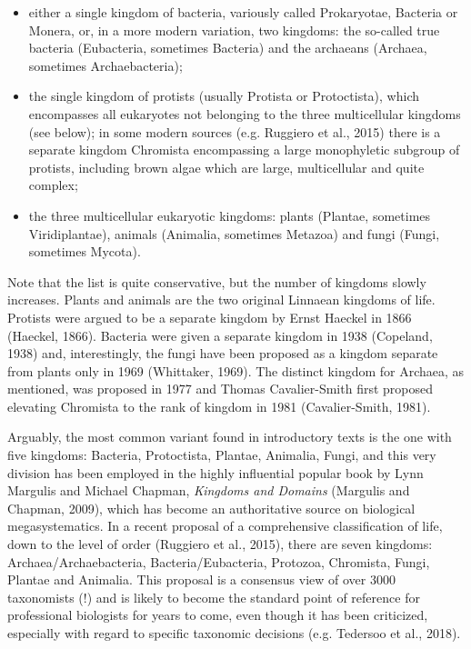 \documentclass[a4paper]{article}
\begin{document}
\begin{itemize}
\item either a single kingdom of bacteria, variously called Prokaryotae, Bacteria or Monera, or, in a more modern
variation, two kingdoms: the so-called true bacteria (Eubacteria, sometimes Bacteria) and the archaeans (Archaea,
sometimes Archaebacteria);
\item the single kingdom of protists (usually Protista or Protoctista), which encompasses all eukaryotes not belonging
to the three multicellular kingdoms (see below); in some modern sources \label{ref:RNDdqkS30YvK5}(e.g. Ruggiero et al.,
2015) there is a separate kingdom Chromista encompassing a large monophyletic subgroup of protists, including brown
algae which are large, multicellular and quite complex;
\item the three multicellular eukaryotic kingdoms: plants (Plantae, sometimes Viridiplantae), animals (Animalia,
sometimes Metazoa) and fungi (Fungi, sometimes Mycota). 
\end{itemize}
Note that the list is quite conservative, but the number of kingdoms slowly increases. Plants and  animals are the two
original Linnaean kingdoms of life. Protists were argued to be a separate kingdom by Ernst Haeckel in 1866
\label{ref:RNDnC4UhA8FAD}(Haeckel, 1866). Bacteria were given a separate kingdom in 1938
\label{ref:RNDsDaQPHVHjj}(Copeland, 1938) and, interestingly, the fungi have been proposed as a kingdom separate from
plants only in 1969 \label{ref:RNDzC4ki5UDBu}(Whittaker, 1969). The distinct kingdom for Archaea, as mentioned, was
proposed in 1977 and Thomas Cavalier-Smith first proposed elevating Chromista to the rank of kingdom in 1981
\label{ref:RNDnKGExfa2wY}(Cavalier-Smith, 1981). 

Arguably, the most common variant found in introductory texts is the one with five kingdoms: Bacteria, Protoctista,
Plantae, Animalia, Fungi, and this very division has been employed in the highly influential popular book by Lynn
Margulis and Michael Chapman, \textit{Kingdoms and Domains }\label{ref:RND5xqZMYPEO1}(Margulis and Chapman, 2009),
which has become an authoritative source on biological megasystematics. In a recent proposal of a comprehensive
classification of life, down to the level of order \label{ref:RNDva9PR88ZHQ}(Ruggiero et al., 2015), there are seven
kingdoms: Archaea/Archaebacteria, Bacteria/Eubacteria, Protozoa, Chromista, Fungi, Plantae and Animalia. This proposal
is a consensus view of over 3000 taxonomists (!) and is likely to become the standard point of reference for
professional biologists for years to come, even though it has been criticized, especially with regard to specific
taxonomic decisions \label{ref:RND4kurLEBPnA}(e.g. Tedersoo et al., 2018).
\end{document}
